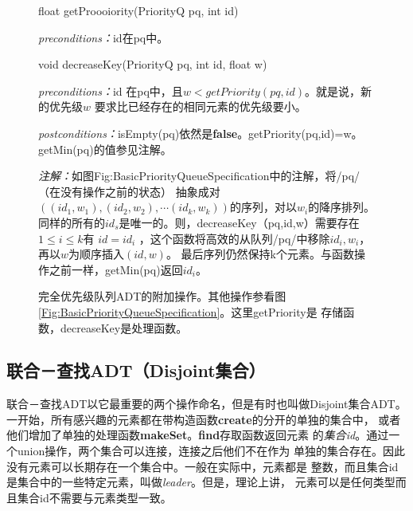 \begin{figure*}[!t]
\colorbox[rgb]{0.9, 0.9, 0.9}{float getProooiority(PriorityQ pq, int id)}

\emph{preconditions：}id在pq中。

\colorbox[rgb]{0.9, 0.9, 0.9}{void decreaseKey(PriorityQ pq, int id, float w)}

\emph{preconditions：}id 在pq中，且$w<getPriority(pq,id)$。就是说，新的优先级$w$
        要求比已经存在的相同元素的优先级要小。

\emph{postconditions：}isEmpty(pq)依然是\textbf{false}。getPriority(pq,id)=w。
        getMin(pq)的值参见注解。

\emph{注解：}如图{Fig:BasicPriorityQueueSpecification}中的注解，将/pq/（在没有操作之前的状态）
            抽象成对$((id_1,w_1),(id_2, w_2), \cdots (id_k, w_k))$的序列，对以$w_i$的降序排列。
            同样的所有的$id_s$是唯一的。则，decreaseKey（pq,id,w）需要存在$1\leq i \leq k$有
            $id=id_i$ ，这个函数将高效的从队列/pq/中移除$id_i, w_i$，再以$w$为顺序插入$(id,w)$。
            最后序列仍然保持k个元素。与函数操作之前一样，getMin(pq)返回$id_i$。
    \caption{完全优先级队列ADT的附加操作。其他操作参看图
            \ref{Fig:BasicPriorityQueueSpecification}。这里getPriority是
            存储函数，decreaseKey是处理函数。}
    \label{Fig:CompletePriorityQueueSpecification}
\end{figure*}

\subsection{联合－查找ADT（Disjoint集合）}\label{Sec:2_3_2Union_Find}
联合－查找ADT以它最重要的两个操作命名，但是有时也叫做Disjoint集合ADT。
一开始，所有感兴趣的元素都在带构造函数\textbf{create}的分开的单独的集合中，
或者他们增加了单独的处理函数\textbf{makeSet}。\textbf{find}存取函数返回元素
的\emph{集合id}。通过一个union操作，两个集合可以连接，连接之后他们不在作为
单独的集合存在。因此没有元素可以长期存在一个集合中。一般在实际中，元素都是
整数，而且集合id是集合中的一些特定元素，叫做\emph{leader}。但是，理论上讲，
元素可以是任何类型而且集合id不需要与元素类型一致。

